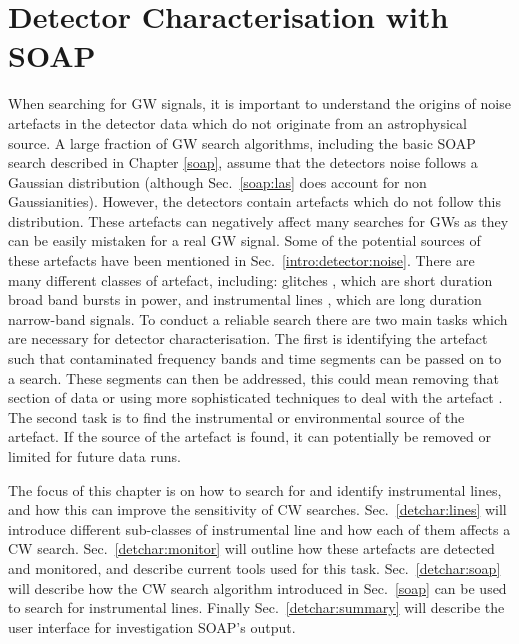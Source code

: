 \chapter{\label{detchar}Detector Characterisation with SOAP}

When searching for \gls{GW} signals, it is important to understand the origins
of noise artefacts in the detector data which do not originate from an
astrophysical source.  A large fraction of \gls{GW} search algorithms,
including the basic SOAP search described in Chapter \ref{soap}, assume that the detectors noise follows a Gaussian
distribution (although Sec.~\ref{soap:las} does account for non Gaussianities).  However, the detectors contain artefacts which do not follow
this distribution.  These artefacts can negatively affect many searches for
\glspl{GW} as they can be easily mistaken for a real \gls{GW} signal.  Some of
the potential sources of these artefacts have been mentioned in
Sec.~\ref{intro:detector:noise}.  There are many different classes of artefact,
including: glitches \citep{aasi2015CharacterizationLIGO,abbott2016CharacterizationTransienta}, which are short duration broad band bursts in
power, and instrumental lines \citep{covas2018IdentificationMitigation}, which are long duration narrow-band signals.  To conduct a
reliable search there are two main tasks which are necessary for detector
characterisation.  The first is identifying the artefact such that contaminated frequency bands and time segments can be passed on to a search.  These segments can then be addressed, this could mean removing that section of
data or using more sophisticated techniques to deal with the artefact
\citep{pankow2018MitigationInstrumental}.  The second task is to find the
instrumental or environmental source of the artefact.  If the source of the artefact is found, it can
potentially be removed or limited for future data runs.

The focus of this chapter is on how to search for and identify instrumental lines, and how this can improve the sensitivity of \gls{CW} searches.
Sec.~\ref{detchar:lines} will introduce different sub-classes of instrumental line and how each of them affects a \gls{CW} search.
Sec.~\ref{detchar:monitor} will outline how these artefacts are detected and monitored, and describe current tools used for this task.
Sec.~\ref{detchar:soap} will describe how the \gls{CW} search algorithm
introduced in Sec.~\ref{soap} can be used to search for instrumental lines.
Finally Sec.~\ref{detchar:summary} will describe the user interface for investigation SOAP's output.



